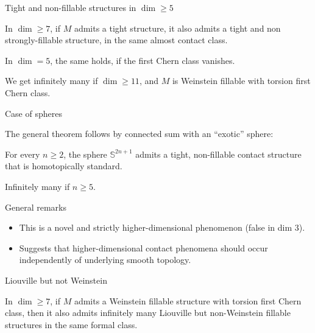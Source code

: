 \documentclass{beamer}
\begin{document}
\begin{frame}{Tight and non-fillable structures in $\dim \geq 5$}

\begin{theorem}
In $\dim \geq 7$, if $M$ admits a tight structure, it also admits a tight and non strongly-fillable structure, in the same almost contact class. 
\pause

\smallskip

In $\dim=5$, the same holds, if the first Chern class vanishes.
\end{theorem}


We get infinitely many if $\dim \geq 11$, and $M$ is Weinstein fillable with torsion first Chern class.

    
\end{frame}

\begin{frame}{Case of spheres}

The general theorem follows by connected sum with an ``exotic'' sphere:

\begin{theorem}
    For every $n \geq 2$, the sphere $\mathbb S^{2n+1}$ admits a tight, non-fillable contact structure that is homotopically standard.
\end{theorem}

\pause

Infinitely many if $n\geq 5$.
    
\end{frame}

\begin{frame}{General remarks}

\begin{itemize}
    \item This is a novel and strictly higher-dimensional phenomenon (false in dim $3$).

\pause
    
    \item Suggests that higher-dimensional contact phenomena should occur independently of underlying smooth topology.
\end{itemize}

    
\end{frame}

\begin{frame}{Liouville but not Weinstein}

\begin{theorem}
    In $\dim \geq 7$, if $M$ admits a Weinstein fillable structure with torsion first Chern class, then it also admits infinitely many Liouville but non-Weinstein fillable structures in the same formal class.
\end{theorem}
    
\end{frame}
\end{document}
